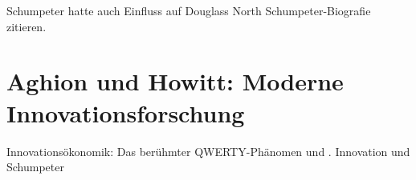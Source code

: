 Schumpeter hatte auch Einfluss auf Douglass North \textcite[S. 11]{Menard2014}
Schumpeter-Biografie zitieren.





\section{Aghion und Howitt: Moderne Innovationsforschung}
\label{Aghion}
Innovationsökonomik: Das berühmter QWERTY-Phänomen \parencite{David1985} und \parencite{Arthur1989}.
\textcite{Aghion1992} Innovation und Schumpeter










